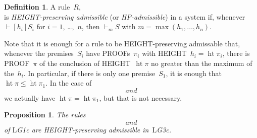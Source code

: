\documentclass[10pt,a4paper]{article}
\newcommand*{\olup}[1]{\MakeUppercase{#1}}
\theoremstyle{plain}
\newtheorem{prop}[thm]{Proposition}
\theoremstyle{definition}
\newtheorem{defn}[thm]{Definition}
\theoremstyle{remark}
\newcommand*{\ollabel}[1]{\label{#1}}
\providecommand{\AxiomC}[1]{}
\providecommand{\TrinaryInfC}[1]{}
\providecommand{\RightLabel}[1]{}
\providecommand{\DisplayProof}{}
\providecommand{\Proves}{\mathrel{\vdash}}
\providecommand{\Log}{\ensuremath{\mathrm{L}}}
\providecommand{\LeftR}[1]{}
\providecommand{\RightR}[1]{}
\providecommand{\pheight}{\operatorname{ht}}
\providecommand{\Weakening}{\mathrm{Wk}}
\providecommand{\RightR}{\mathrm{R}}
\providecommand{\LeftR}{\mathrm{L}}
\begin{document}
\begin{defn}
A rule~$R$,
\[
\AxiomC{$S_1$}
\AxiomC{$\dots$}
\AxiomC{$S_n$}
\RightLabel{$R$}
\TrinaryInfC{$S$}
\DisplayProof
\]
is \emph{\olup{height}-preserving admissible} (or
\emph{\olup{hp}-admissible}) in a system if, whenever $\Proves[h_i] S_i$
for $i = 1$, \dots,~$n$, then $\Proves_m S$ with $m = \max(h_1, \dots,
h_n)$.
\end{defn}

Note that it is enough for a rule to be \olup{height}-preserving
admissable that, whenever the premises~$S_i$ have \olup{proof}s~$\pi_i$
with \olup{height}~$h_i = \pheight{\pi_i}$, there is \olup{proof}~$\pi$ of
the conclusion of \olup{height}~$\pheight{\pi}$ no greater than the
maximum of the~$h_i$. In particular, if there is only one
premise~$S_1$, it is enough that $\pheight{\pi} \le \pheight{\pi_1}$.
In the case of $\RightR{\Weakening}$ and $\LeftR{\Weakening}$ we
actually have $\pheight{\pi} = \pheight{\pi_1}$, but that is not
necessary.

\begin{prop}\ollabel{prop:weak-G3c-adm}
The rules $\RightR{\Weakening}$ and $\LeftR{\Weakening}$ of \Log{G1c} are
\olup{height}-preserving admissible in~\Log{G3c}.
\end{prop}
\end{document}
